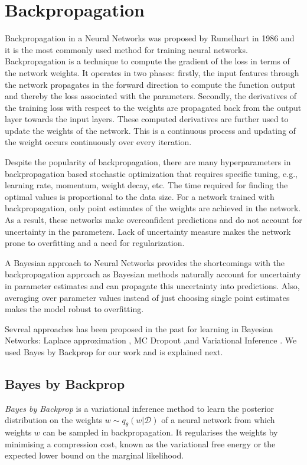 \section{Backpropagation}

Backpropagation in a Neural Networks was proposed by Rumelhart \cite{Rumelhart} in 1986 and it is the most commonly used method for training neural networks. Backpropagation is a technique to compute the gradient of the loss in terms of the network weights. It operates in two phases: firstly, the input features through the network propagates in the forward direction to compute the function output and thereby the loss associated with the parameters. Secondly, the derivatives of the training loss with respect to the weights
are propagated back from the output layer towards the input layers.
These computed derivatives are further used to update the weights of the network. This is a continuous process and updating of the weight occurs continuously over every iteration. 

Despite the popularity of backpropagation, there are many hyperparameters in backpropagation based stochastic optimization that requires specific tuning, e.g., learning rate, momentum, weight decay, etc. The time required for finding the optimal values is proportional to the data size. For a network trained with backpropagation, only point estimates of the weights are achieved in the network. As a result, these networks make overconfident predictions and do not account for uncertainty in the parameters. Lack of uncertainty measure makes the network prone to overfitting and a need for regularization.

A Bayesian approach to Neural Networks provides the shortcomings with the backpropagation approach \cite{mackay1996hyperparameters} as Bayesian methods naturally account for uncertainty in parameter estimates and can propagate this uncertainty into predictions.
Also, averaging over parameter values instead of just choosing single point estimates makes the model robust to overfitting. 

Sevreal approaches has been proposed in the past for learning in Bayesian Networks: Laplace approximation \cite{Mackay1991APB}, MC Dropout \cite{gal2015bayesian},and Variational Inference \cite{hinton1993keeping} \cite{graves2011practical} \cite{blundell2015weight}. We used Bayes by Backprop \cite{blundell2015weight} for our work and is explained next.

\subsection{Bayes by Backprop}
\textit{Bayes by Backprop} \cite{graves2011practical, blundell2015weight} is a variational inference method to learn the posterior distribution on the weights $w \sim q_{\theta}(w|\mathcal{D})$ of a neural network from which weights $w$ can be sampled in backpropagation. 
It regularises the weights by minimising a compression cost, known as the variational free energy or the expected lower bound on the marginal likelihood.

